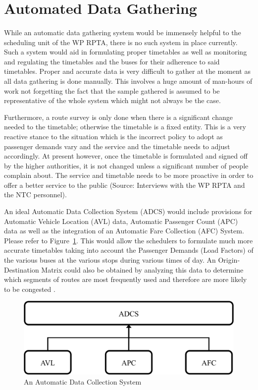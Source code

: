 \documentclass[12pt, oneside]{report}
\begin{document}
\section{Automated Data Gathering}

\paragraph{ } While an automatic data gathering system would be immensely helpful to the scheduling unit of the WP RPTA, there is no such system in place currently. Such a system would aid in formulating proper timetables as well as monitoring and regulating the timetables and the buses for their adherence to said timetables. Proper and accurate data is very difficult to gather at the moment as all data gathering is done manually. This involves a huge amount of man-hours of work not forgetting the fact that the sample gathered is assumed to be representative of the whole system which might not always be the case.

Furthermore, a route survey is only done when there is a significant change needed to the timetable; otherwise the timetable is a fixed entity. This is a very reactive stance to the situation which is the incorrect policy to adopt as passenger demands vary and the service and the timetable needs to adjust accordingly. At present however, once the timetable is formulated and signed off by the higher authorities, it is not changed unless a significant number of people complain about. The service and timetable needs to be more proactive in order to offer a better service to the public (Source: Interviews with the WP RPTA and the NTC personnel).

An ideal Automatic Data Collection System (ADCS) would include provisions for Automatic Vehicle Location (AVL) data, Automatic Passenger Count (APC) data as well as the integration of an Automatic Fare Collection (AFC) System. Please refer to Figure~\ref{image-ADCS}. This would allow the schedulers to formulate much more accurate timetables taking into account the Passenger Demands (Load Factors) of the various buses at the various stops during various times of day. An Origin-Destination Matrix could also be obtained by analyzing this data to determine which segments of routes are most frequently used and therefore are more likely to be congested \citep{Wilson2008}.

\begin {figure} [h!]
\centering
\includegraphics[scale=0.6]{ADCS}
\caption [An Automatic Data Collection System] {An Automatic Data Collection System}
\label {image-ADCS}
\end {figure}
\end{document}
